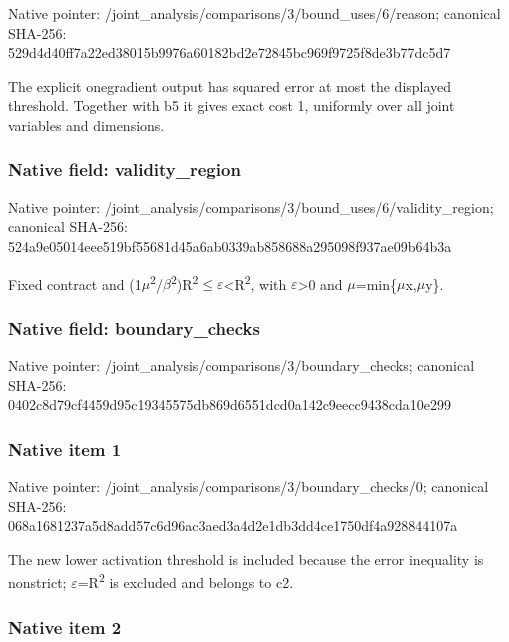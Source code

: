 \documentclass[10pt,a4paper]{article}
\begin{document}
Native pointer: /joint\_analysis/comparis\allowbreak{}ons/3/bound\_uses/6/reaso\allowbreak{}n; canonical SHA-256: 529d4d40ff7a22ed38015b99\allowbreak{}76a60182bd2e72845bc969f9\allowbreak{}725f8de3b77dc5d7


The explicit onegradient output has squared error at most the displayed threshold. Together with b5 it gives exact cost 1, uniformly over all joint variables and dimensions.


\subsubsection{Native field: validity\_region}


Native pointer: /joint\_analysis/comparis\allowbreak{}ons/3/bound\_uses/6/valid\allowbreak{}ity\_region; canonical SHA-256: 524a9e05014eee519bf55681\allowbreak{}d45a6ab0339ab858688a2950\allowbreak{}98f937ae09b64b3a


Fixed contract and (1\ensuremath{\mu}\textsuperscript{2}/\ensuremath{\beta}\textsuperscript{2})R\textsuperscript{2}\ensuremath{\le}\ensuremath{\varepsilon}<R\textsuperscript{2}, with \ensuremath{\varepsilon}>0 and \ensuremath{\mu}=min\{\ensuremath{\mu}x,\ensuremath{\mu}y\}.


\subsubsection{Native field: boundary\_checks}


Native pointer: /joint\_analysis/comparis\allowbreak{}ons/3/boundary\_checks; canonical SHA-256: 0402c8d79cf4459d95c19345\allowbreak{}575db869d6551dcd0a142c9e\allowbreak{}ecc9438cda10e299



\subsubsection{Native item 1}


Native pointer: /joint\_analysis/comparis\allowbreak{}ons/3/boundary\_checks/0; canonical SHA-256: 068a1681237a5d8add57c6d9\allowbreak{}6ac3aed3a4d2e1db3dd4ce17\allowbreak{}50df4a928844107a


The new lower activation threshold is included because the error inequality is nonstrict; \ensuremath{\varepsilon}=R\textsuperscript{2} is excluded and belongs to c2.


\subsubsection{Native item 2}
\end{document}
